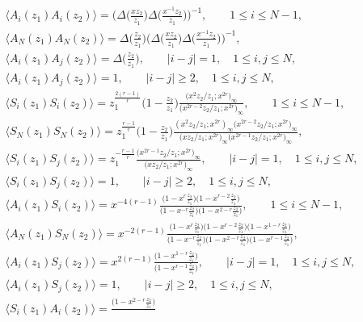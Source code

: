 \documentclass[10pt,a4paper]{amsart}
\numberwithin{equation}{section}
\begin{document}
\begin{gather}
\langle A_i(z_1)A_i(z_2)\rangle
=\bigg(\Delta\bigg(\frac{xz_2}{z_1}\bigg)
\Delta\bigg(\frac{x^{-1}z_2}{z_1}\bigg)\bigg)^{-1},\qquad
1\leq i \leq N-1,\nonumber
\\
\langle A_N(z_1)A_N(z_2)\rangle
=\Delta\bigg(\frac{z_2}{z_1}\bigg)
\bigg(\Delta\bigg(\frac{x z_2}{z_1}\bigg)
\Delta\bigg(\frac{x^{-1}z_2}{z_1}\bigg)\bigg)^{-1},\nonumber
\\
\langle A_i(z_1)A_j(z_2)\rangle
=\Delta\bigg(\frac{z_2}{z_1}\bigg),\qquad
|i-j|=1,\quad 1\leq i, j \leq N,\nonumber
\\
\langle A_i(z_1)A_j(z_2)\rangle=1,\qquad
|i-j|\geq 2,\quad 1\leq i, j \leq N,\label{appendix:A}
\\
\langle S_i(z_1)S_i(z_2)\rangle
=z_1^{\frac{2(r-1)}{r}}\bigg(1-\frac{z_2}{z_1}\bigg)
\frac{\big(x^2z_2/z_1;x^{2r}\big)_\infty}{\big(x^{2r-2}z_2/z_1;x^{2r}\big)_\infty},\qquad
1\leq i \leq N-1,\nonumber
\\
\langle S_N(z_1)S_N(z_2)\rangle
=z_1^{\frac{r-1}{r}}\bigg(1-\frac{z_2}{z_1}\bigg)
\frac{(x^2z_2/z_1;x^{2r})_\infty \big(x^{2r-2}z_2/z_1;x^{2r}\big)_\infty}{
\big(xz_2/z_1;x^{2r}\big)_\infty \big(x^{2r-1}z_2/z_1;x^{2r}\big)_\infty},\nonumber
\\
\langle S_i(z_1)S_j(z_2)\rangle
=z_1^{-\frac{r-1}{r}}\frac{\big(x^{2r-1}z_2/z_1;x^{2r}\big)_\infty}{\big(xz_2/z_1;x^{2r}\big)_\infty},\qquad
|i-j|=1,\quad 1\leq i,j \leq N,\nonumber
\\
\langle S_i(z_1)S_j(z_2)\rangle=1,\qquad
|i-j|\geq 2,\quad 1\leq i, j \leq N,
\label{appendix:S}
\\
\langle A_i(z_1)S_i(z_2)\rangle=x^{-4(r-1)}
\frac{\big(1-x^r\frac{z_2}{z_1}\big)\big(1-x^{r-2}\frac{z_2}{z_1}\big)}{
\big(1-x^{-r}\frac{z_2}{z_1}\big)\big(1-x^{2-r}\frac{z_2}{z_1}\big)},\qquad
1\leq i \leq N-1,\nonumber
\\
\langle A_N(z_1)S_N(z_2)\rangle=x^{-2(r-1)}\frac{
\big(1-x^r\frac{z_2}{z_1}\big)\big(1-x^{r-2}\frac{z_2}{z_1}\big)
\big(1-x^{1-r}\frac{z_2}{z_1}\big)}{\big(1-x^{-r}\frac{z_2}{z_1}\big)
\big(1-x^{2-r}\frac{z_2}{z_1}\big)\big(1-x^{r-1}\frac{z_2}{z_1}\big)},
\\
\langle A_i(z_1)S_j(z_2)\rangle
=x^{2(r-1)}\frac{\big(1-x^{1-r}\frac{z_2}{z_1}\big)}{\big(1-x^{r-1}\frac{z_2}{z_1}\big)},\qquad
|i-j|=1,\quad 1\leq i,j \leq N,\nonumber
\\
\langle A_i(z_1)S_j(z_2)\rangle=1,\qquad
|i-j|\geq 2,\quad 1\leq i,j \leq N,
\label{appendix:AS}
\\
\langle S_i(z_1)A_i(z_2)\rangle=\frac{\big(1-x^{2-r}\frac{z_2}{z_1}\big)}{
}
\end{gather}
\end{document}
